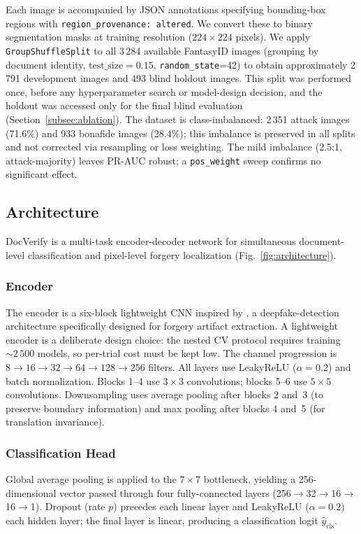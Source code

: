 \documentclass[final,5p,times,twocolumn,number]{elsarticle}
\newcommand{\rev}[1]{#1}
\begin{document}
Each image is accompanied by JSON annotations specifying bounding-box regions
with \texttt{region\_provenance: altered}. We convert these to binary
segmentation masks at training resolution ($224 \times 224$ pixels). We
apply \texttt{GroupShuffleSplit} to all 3\,284 available FantasyID images
(grouping by document identity, $\text{test\_size}=0.15$,
\texttt{random\_state}=42) to obtain approximately 2\,791 development images
and 493 blind holdout images. \rev{This split was performed once,
before any hyperparameter search or model-design decision, and the holdout
was accessed only for the final blind evaluation
(Section~\ref{subsec:ablation}).} The dataset is class-imbalanced:
2\,351 attack images (71.6\%) and 933 bonafide images (28.4\%); this
imbalance is preserved in all splits and not corrected via resampling or
loss weighting. \rev{The mild imbalance (2.5:1, attack-majority)
leaves PR-AUC robust; a \texttt{pos\_weight} sweep confirms no significant
effect.}

\subsection{Architecture}
\label{subsec:arch}

DocVerify is a multi-task encoder-decoder network for simultaneous
document-level classification and pixel-level forgery localization
(Fig.~\ref{fig:architecture}).

\subsubsection{Encoder}
The encoder is a six-block lightweight CNN inspired by \citet{patel2023dcnn},
a deepfake-detection architecture specifically designed for forgery artifact
extraction. A lightweight encoder is a deliberate design choice: the nested
CV protocol requires training ${\sim}2\,500$ models, so per-trial cost must
be kept low. The channel progression is $8 \to 16 \to 32 \to 64 \to 128 \to
256$ filters. All layers use LeakyReLU ($\alpha=0.2$)
and batch normalization. Blocks 1--4 use $3 \times 3$
convolutions; blocks 5--6 use $5 \times 5$ convolutions. Downsampling uses
average pooling after blocks 2 and~3 (to preserve boundary information) and
max pooling after blocks 4 and~5 (for translation invariance).

\subsubsection{Classification Head}
Global average pooling is applied to the $7 \times 7$ bottleneck, yielding a
256-dimensional vector passed through four fully-connected layers
(256$\to$32$\to$16$\to$16$\to$1). \rev{Dropout (rate $p$) precedes each linear
layer and LeakyReLU ($\alpha=0.2$) each hidden layer; the final layer is linear,}
producing a classification logit $\hat{y}_{\text{cls}}$.
\end{document}
